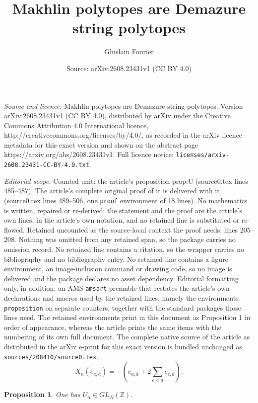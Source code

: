 \documentclass[10pt,a4paper]{amsart}
\title{Makhlin polytopes are Demazure string polytopes}
\author{Ghislain Fourier}
\date{Source: arXiv:2608.23431v1 (CC BY 4.0)}
\newtheorem{proposition}{Proposition}
\newcommand{\ZZ}{\mathbb Z}
\begin{document}
\maketitle

\noindent\emph{Source and licence.} Makhlin polytopes are Demazure string polytopes. Version arXiv:2608.23431v1 (CC BY 4.0), distributed by arXiv under the Creative Commons Attribution 4.0 International licence, http://creativecommons.org/licenses/by/4.0/, as recorded in the arXiv licence metadata for this exact version and shown on the abstract page https://arxiv.org/abs/2608.23431v1. Full licence notice: \texttt{licenses/arxiv-2608.23431-CC-BY-4.0.txt}.\par\smallskip

\noindent\textit{Editorial scope.} Counted unit: the article's proposition prop:U (source0.tex lines 485--487). The article's complete original proof of it is delivered with it (source0.tex lines 489--506, one \texttt{proof} environment of 18 lines). No mathematics is written, repaired or re-derived: the statement and the proof are the article's own lines, in the article's own notation, and no retained line is substituted or re-flowed.  Retained uncounted as the source-local context the proof needs: lines 205--208.  Nothing was omitted from any retained span, so the package carries no omission record.  No retained line contains a citation, so the wrapper carries no bibliography and no bibliography entry.  No retained line contains a figure environment, an image-inclusion command or drawing code, so no image is delivered and the package declares no asset dependency.  Editorial formatting only, in addition: an AMS \texttt{amsart} preamble that restates the article's own declarations and macros used by the retained lines, namely the environments \texttt{proposition} on separate counters, together with the standard packages those lines need.  The retained environments print in this document as Proposition 1 in order of appearance, whereas the article prints the same items with the numbering of its own full document.  The complete native source of the article as distributed in the arXiv e-print for this exact version is bundled unchanged as \texttt{sources/208410/source0.tex}.
\begin{equation}\label{eq:Xdiag}
 X_n(e_{a,\bar a})
  =-\left(e_{a,\bar a}+2\sum_{c<a}e_{c,\bar a}\right).
\end{equation}

\begin{proposition}\label{prop:U}
One has $U_n\in GL_N(\ZZ)$.
\end{proposition}
\end{document}
